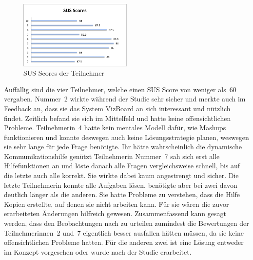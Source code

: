 \documentclass[
	headsepline,
	footsepline,
	fontsize=12pt,
	bibliography=totoc
]{scrbook}
\begin{document}
\begin{figure}[htbp]
   \centering
   \includegraphics[width=0.5\textwidth]{images/evaluation-result-sus.png}
   \caption{SUS Scores der Teilnehmer}
   \label{figure:result-sus}
\end{figure}


Auffällig sind die vier Teilnehmer, welche einen SUS Score von weniger als~60 vergaben. Nummer~2 wirkte während der Studie sehr sicher und merkte auch im Feedback an, dass sie das System VizBoard an sich interessant und nützlich findet. Zeitlich befand sie sich im Mittelfeld und hatte keine offensichtlichen Probleme. Teilnehmerin~4 hatte kein mentales Modell dafür, wie Mashups funktionieren und konnte deswegen auch keine Lösungsstrategie planen, weswegen sie sehr lange für jede Frage benötigte. Ihr hätte wahrscheinlich die dynamische Kommunikationshilfe genützt Teilnehmerin Nummer~7 sah sich erst alle Hilfefunktionen an und löste danach alle Fragen vergleichsweise schnell, bis auf die letzte auch alle korrekt. Sie wirkte dabei kaum angestrengt und sicher. Die letzte Teilnehmerin konnte alle Aufgaben lösen, benötigte aber bei zwei davon deutlich länger als die anderen. Sie hatte Probleme zu verstehen, dass die Hilfe Kopien erstellte, auf denen sie nicht arbeiten kann. Für sie wären die zuvor erarbeiteten Änderungen hilfreich gewesen. Zusammenfassend kann gesagt werden, dass den Beobachtungen nach zu urteilen zumindest die Bewertungen der Teilnehmerinnen~2 und~7 eigentlich besser ausfallen hätten müssen, da sie keine offensichtlichen Probleme hatten. Für die anderen zwei ist eine Lösung entweder im Konzept vorgesehen oder wurde nach der Studie erarbeitet.
\end{document}
